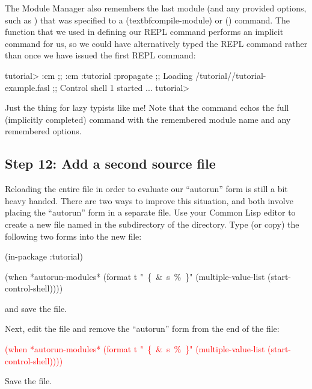 \documentclass[10pt,twoside,english,pdftex]{article}
\begin{document}
The Module Manager also remembers the last module (and any provided options,
such as ) that was specified to a 
(textbf{compile-module}) or  () command.
The  function that we used in defining our
 REPL command performs an implicit  command for us,
so we could have alternatively typed the  REPL command rather than
 once we have issued the first  REPL command:
%
\W\supp
\begin{smallexample}
\textcolor{darkergray}{%
  tutorial> \textcolor{black}{:cm}
  ;; :cm :tutorial :propagate
  ;; Loading /tutorial//tutorial-example.fasl
  ;; Control shell 1 started
     ...
  tutorial>}
\end{smallexample}
%
Just the thing for lazy typists like me!  Note that the  command
echos the full (implicitly completed) command with the remembered module name
and any remembered options.

\subsection*{Step 12: Add a second source file}

Reloading the entire  file in order to
evaluate our ``autorun'' form is still a bit heavy handed.  There are two ways
to improve this situation, and both involve placing the ``autorun'' form in a
separate file.  Use your Common Lisp editor to create a new file named
 in the  subdirectory of the
 directory. Type (or copy) the following two forms into the new
 file:
%
\W\supp
\begin{example}
  (in-package :tutorial)

  (when *autorun-modules*
    (format t "~\{~\&~s~\%~\}" (multiple-value-list (start-control-shell))))
\end{example}
%
and save the file.  

Next, edit the  file and remove the
``autorun'' form from the end of the file:
% 
\W\supp
\begin{example}
\textcolor{red}{%
  (when *autorun-modules* 
    (format t "~\{~\&~s~\%~\}" (multiple-value-list (start-control-shell))))}
\end{example}
%
Save the file. 
\end{document}
